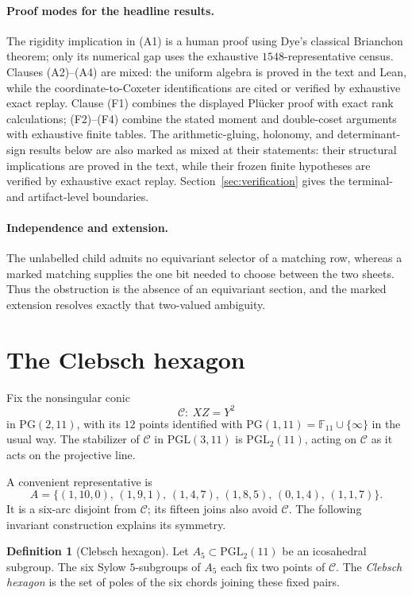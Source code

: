 \documentclass[11pt]{article}
\theoremstyle{definition}
\newtheorem{definition}[theorem]{Definition}
\theoremstyle{remark}
\newcommand{\PG}{\mathrm{PG}}
\newcommand{\F}{\mathbb{F}}
\newcommand{\cC}{\mathcal{C}}
\newcommand{\A}{A_5}
\begin{document}
\paragraph{Proof modes for the headline results.}
The rigidity implication in (A1) is a human proof using Dye's classical
Brianchon theorem; only its numerical gap uses the exhaustive
$1548$-representative census.  Clauses (A2)--(A4) are mixed: the uniform
algebra is proved in the text and Lean, while the coordinate-to-Coxeter
identifications are cited or verified by exhaustive exact replay.  Clause (F1) combines
the displayed Pl\"ucker proof with exact rank calculations; (F2)--(F4)
combine the stated moment and double-coset arguments with exhaustive
finite tables.  The arithmetic-gluing, holonomy, and determinant-sign
results below are also marked as mixed at their statements: their
structural implications are proved in the text, while their frozen finite
hypotheses are verified by exhaustive exact replay.  Section~\ref{sec:verification} gives
the terminal- and artifact-level boundaries.

\paragraph{Independence and extension.}
The unlabelled child admits no equivariant selector of a matching row,
whereas a marked matching supplies the one bit needed to choose between
the two sheets.  Thus the obstruction is the absence of an equivariant
section, and the marked extension resolves exactly that two-valued
ambiguity.

\section{The Clebsch hexagon}
\label{sec:hexagon}

Fix the nonsingular conic
\[
 \cC:\ XZ=Y^2
\]
in $\PG(2,11)$, with its $12$ points identified with $\PG(1,11)=\F_{11}\cup\{\infty\}$
in the usual way. The stabilizer of $\cC$ in $\mathrm{PGL}(3,11)$ is
$\mathrm{PGL}_2(11)$, acting on $\cC$ as it acts on the projective line.

A convenient representative is
\[
 A=\{(1,10,0),\,(1,9,1),\,(1,4,7),\,(1,8,5),\,(0,1,4),\,(1,1,7)\}.
\]
It is a six-arc disjoint from $\cC$; its fifteen joins also avoid $\cC$.
The following invariant construction explains its symmetry.

\begin{definition}[Clebsch hexagon]
\label{def:hexagon}
Let $\A\subset\mathrm{PGL}_2(11)$ be an icosahedral subgroup. The
six Sylow $5$-subgroups of $\A$ each fix two points of $\cC$. The
\emph{Clebsch hexagon} is the set of poles of the six chords joining these
fixed pairs.
\end{definition}
\end{document}
